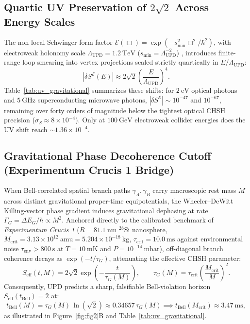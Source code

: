 \documentclass[11pt,a4paper]{article}
\begin{document}
\subsection{Quartic UV Preservation of $2\sqrt{2}$ Across Energy Scales}
The non-local Schwinger form-factor $\mathcal{E}(\Box) = \exp(-s_{\min}^2 \Box^2 / \hbar^2)$, with electroweak holonomy scale $\Lambda_{\mathrm{UPD}} = 1.2\ \mathrm{TeV}$ ($s_{\min} = \Lambda_{\mathrm{UPD}}^{-2}$) \cite{PavliukHiggs,PavliukMuon}, introduces finite-range loop smearing into vertex projections scaled strictly quartically in $E / \Lambda_{\mathrm{UPD}}$:
\begin{equation}
|\delta S^{\mathcal{E}}(E)| \approx 2\sqrt{2}\left(\frac{E}{\Lambda_{\mathrm{UPD}}}\right)^4.
\end{equation}
Table~\ref{tab:uv_gravitational} summarizes these shifts: for $2\ \mathrm{eV}$ optical photons and $5\ \mathrm{GHz}$ superconducting microwave photons, $|\delta S^{\mathcal{E}}| \sim 10^{-47}$ and $10^{-67}$, remaining over forty orders of magnitude below the tightest optical CHSH precision ($\sigma_S \approx 8 \times 10^{-4}$). Only at $100\ \mathrm{GeV}$ electroweak collider energies does the UV shift reach $\sim 1.36 \times 10^{-4}$.

\subsection{Gravitational Phase Decoherence Cutoff (Experimentum Crucis 1 Bridge)}
When Bell-correlated spatial branch paths $\gamma_A, \gamma_B$ carry macroscopic rest mass $M$ across distinct gravitational proper-time equipotentials, the Wheeler--DeWitt Killing-vector phase gradient induces gravitational dephasing at rate $\Gamma_G = \Delta E_G / \hbar \propto M^2$. Anchored directly to the calibrated benchmark of \textit{Experimentum Crucis 1} \cite{PavliukMonograph,PavliukEC1} ($R = 81.1\ \mathrm{nm}$ $^{28}\mathrm{Si}$ nanosphere, $M_{\mathrm{crit}} = 3.13 \times 10^{12}\ \mathrm{amu} = 5.204 \times 10^{-18}\ \mathrm{kg}$, $\tau_{\mathrm{crit}} = 10.0\ \mathrm{ms}$ against environmental noise $\tau_{\mathrm{env}} > 800\ \mathrm{s}$ at $T = 10\ \mathrm{mK}$ and $P = 10^{-14}\ \mathrm{mbar}$), off-diagonal branch coherence decays as $\exp(-t/\tau_G)$, attenuating the effective CHSH parameter:
\begin{equation}
S_{\mathrm{eff}}(t, M) = 2\sqrt{2}\exp\!\left(-\frac{t}{\tau_G(M)}\right), \qquad \tau_G(M) = \tau_{\mathrm{crit}}\left(\frac{M_{\mathrm{crit}}}{M}\right)^2.
\end{equation}
Consequently, UPD predicts a sharp, falsifiable Bell-violation horizon $S_{\mathrm{eff}}(t_{\mathrm{Bell}}) = 2$ at:
\begin{equation}
t_{\mathrm{Bell}}(M) = \tau_G(M)\,\ln\!\left(\sqrt{2}\right) \approx 0.34657\,\tau_G(M) \implies t_{\mathrm{Bell}}(M_{\mathrm{crit}}) \approx 3.47\ \mathrm{ms},
\end{equation}
as illustrated in Figure~\ref{fig:fig2}B and Table~\ref{tab:uv_gravitational}.
\end{document}
